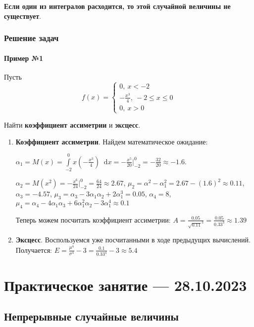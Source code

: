 \documentclass{article}
\newcommand*\diff{\mathop{}\!\mathrm{d}}
\begin{document}
\textbf{Если один из интегралов расходится, то этой случайной величины не существует}.

\subsubsection{Решение задач}

\paragraph{Пример №1}

Пусть $$f(x) = \begin{cases}
    0, \ x < -2 \\
    -\frac{x^{3}}{4}, \ -2 \le x \le 0 \\
    0, \ x > 0
\end{cases}$$

Найти \textbf{коэффициент ассиметрии} и \textbf{эксцесс}.

\begin{enumerate}
    \item \textbf{Коэффициент ассиметрии}. Найдем математическое ожидание:
    
    $\alpha_1 = M(x) = \int\limits_{-2}^{0} x (-\frac{x^3}{4}) \diff x = - \frac{x^5}{20} \bigg|_{-2}^{0} = - \frac{32}{20} \approx - 1.6$. 
    
    $\alpha_2 = M(x^2) = -\frac{x^6}{24} \bigg|_{-2}^{0} = \frac{64}{24} \approx 2.67$, $\mu_2 = \alpha^2 - \alpha_1^2 = 2.67 - (1.6)^2 \approx 0.11$, $\alpha_3 = -4.57$, $\mu_3=\alpha_3 - 3\alpha_1 \alpha_2 + 2 \alpha_1^3 = 0.05$, $\alpha_4 = 8$, $\mu_4 = \alpha_4 - 4\alpha_1 \alpha_3 + 6\alpha_1^2 \alpha_2 - 3\alpha_1^4 \approx 0.1$

    Теперь можем посчитать коэффициент ассиметрии: $A = \frac{0.05}{\sqrt{0.11}^3} = \frac{0.05}{0.33^3} \approx 1.39$
    \item \textbf{Эксцесс}. Воспользуемся уже посчитанными в ходе предыдущих вычислений. Получается: $E = \frac{\mu^{4}}{\sigma^4} - 3 = \frac{0.1}{0.33^4} - 3 \approx 5.4$
\end{enumerate}

\section{Практическое занятие — 28.10.2023}

\subsection{Непрерывные случайные величины}
\end{document}
